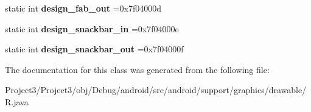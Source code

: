 \begin{DoxyCompactItemize}
static int {\bfseries design\+\_\+fab\+\_\+out} =0x7f04000d
\item 
\mbox{\label{classandroid_1_1support_1_1graphics_1_1drawable_1_1R_1_1anim_a351331d301c12059094e84632f8f18b0}} 
static int {\bfseries design\+\_\+snackbar\+\_\+in} =0x7f04000e
\item 
\mbox{\label{classandroid_1_1support_1_1graphics_1_1drawable_1_1R_1_1anim_a46f8f5976e0be80c08f0029127937269}} 
static int {\bfseries design\+\_\+snackbar\+\_\+out} =0x7f04000f
\end{DoxyCompactItemize}


The documentation for this class was generated from the following file\+:\begin{DoxyCompactItemize}
\item 
Project3/\+Project3/obj/\+Debug/android/src/android/support/graphics/drawable/R.\+java\end{DoxyCompactItemize}
